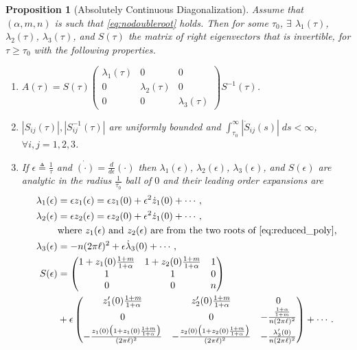 \documentclass[a4paper,11pt]{article}
\def\l{(2\pi \ell)}
\newtheorem{proposition}{Proposition}[section]
\theoremstyle{remark}
\begin{document}
\begin{proposition}[Absolutely Continuous Diagonalization] \label{prop:ctsdiag}
 Assume that $(\alpha,m,n)$ is such that \eqref{eq:nodoubleroot} holds. Then for some $\tau_0$, $\exists$ $\lambda_1(\tau)$, $\lambda_2(\tau)$, $\lambda_3(\tau)$, and $S(\tau)$ the matrix of right eigenvectors that is invertible, for $\tau\ge\tau_0$  with the following properties.
 \begin{enumerate}
  \item $A(\tau) = S(\tau) \begin{pmatrix} \lambda_1(\tau) & 0 & 0\\ 0 & \lambda_2(\tau) & 0 \\ 0 & 0 & \lambda_3(\tau) \end{pmatrix} S^{-1}(\tau)$.%
  \item $|S_{ij}(\tau)|, |S^{-1}_{ij}(\tau)|$ are uniformly bounded and %
  $\int_{\tau_0}^\infty |\dot{S}_{ij}(s)|\; ds <\infty$, $\forall i,j=1,2,3$.
  \item If $\epsilon\triangleq \frac{1}{\tau}$ and $\dot{(\cdot)}=\frac{d}{d\epsilon}(\cdot)$ then $\lambda_1(\epsilon)$, $\lambda_2(\epsilon)$, $\lambda_3(\epsilon)$, and $S(\epsilon)$ are analytic in the radius $\frac{1}{\tau_0}$ ball of $0$ and their leading order expansions are
  \begin{align}
   \lambda_1(\epsilon) &= \epsilon z_1(\epsilon) = \epsilon z_1(0) + \epsilon^2 \dot z_1(0) + \cdots,\nonumber\\
   \lambda_2(\epsilon) &= \epsilon z_2(\epsilon) =\epsilon z_2(0) + \epsilon^2 \dot z_1(0) + \cdots,\nonumber\\ &\text{where $z_1(\epsilon)$ and $z_2(\epsilon)$ are from the two roots of \eqref{eq:reduced_poly},}\nonumber \\
   \lambda_3(\epsilon) &= -n\l^2 + \epsilon\dot\lambda_3(0) + \cdots, \nonumber\\
   S(\epsilon) 
   &=\begin{pmatrix}
    1 + z_1(0)\frac{1+m}{1+\alpha} & 1 + z_2(0)\frac{1+m}{1+\alpha} & 1 \nonumber\\
    1 & 1 & 0\\
    0 & 0 & n
   \end{pmatrix} \\&+ \epsilon
   \begin{pmatrix}
    z_1'(0)\frac{1+m}{1+\alpha} & z_2'(0)\frac{1+m}{1+\alpha} & 0 \nonumber\\
    0 & 0 & -\frac{\frac{1+\alpha}{1+m}}{n\l^2}\\
    -\frac{z_1(0)\big(1+z_1(0)\frac{1+m}{1+\alpha}\big)}{\l^2} & -\frac{z_2(0)\big(1+z_2(0)\frac{1+m}{1+\alpha}\big)}{\l^2} & -\frac{\lambda_3'(0)}{n\l^2} \nonumber\\
   \end{pmatrix} + \cdots. 
  \end{align}
 \end{enumerate}
\end{proposition}
\end{document}
